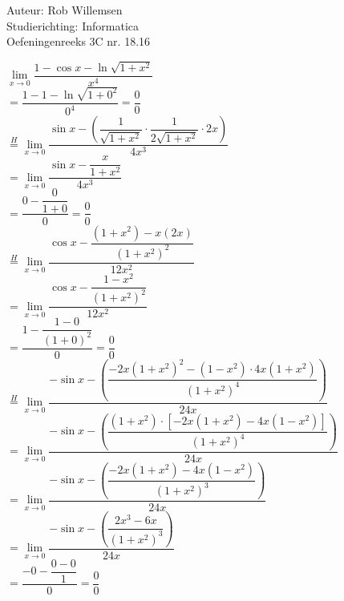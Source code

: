 \documentclass[a4paper]{article}
\newcommand{\limit}{\lim\limits}
\begin{document}
\noindent \large Auteur: Rob Willemsen \\
\noindent \large Studierichting: Informatica \\
\noindent \large Oefeningenreeks 3C nr. 18.16 \\

\medskip

\normalsize

$\limit_{x \rightarrow 0} \dfrac{1 - \cos x - \ln \sqrt{1+x^2}}{x^4} $ \\

$= \dfrac{1 - 1 - \ln \sqrt{1+0^2}}{0^4} = \dfrac{0}{0}$ \\

$\overset{H}{=}\limit_{x \rightarrow 0} \dfrac{\sin x - \left(\dfrac{1}{\sqrt{1+x^2}} \cdot \dfrac{1}{2\sqrt{1+x^2}} \cdot 2x\right)}{4x^3} $ \\

$=\limit_{x \rightarrow 0} \dfrac{\sin x - \dfrac{x}{1+x^2}}{4x^3} $ \\

$= \dfrac{0 - \dfrac{0}{1+0}}{0} = \dfrac{0}{0}$ \\

$\overset{H}{=}\limit_{x \rightarrow 0} \dfrac{\cos x - \dfrac{(1+x^2) - x(2x)}{(1+x^2)^2}}{12x^2} $ \\

$= \limit_{x \rightarrow 0} \dfrac{\cos x - \dfrac{1-x^2}{(1+x^2)^2}}{12x^2} $ \\

$= \dfrac{1 - \dfrac{1-0}{(1+0)^2}}{0} = \dfrac{0}{0}$ \\

$\overset{H}{=}\limit_{x \rightarrow 0} \dfrac{-\sin x - \left(\dfrac{-2x(1+x^2)^2 - (1-x^2) \cdot 4x(1+x^2)}{(1+x^2)^4}\right)}{24x} $ \\

$= \limit_{x \rightarrow 0} \dfrac{-\sin x - \left(\dfrac{(1+x^2) \cdot \left[-2x(1+x^2) - 4x(1-x^2)\right]}{(1+x^2)^4}\right)}{24x} $ \\

$= \limit_{x \rightarrow 0} \dfrac{-\sin x - \left(\dfrac{-2x(1+x^2) - 4x(1-x^2)}{(1+x^2)^3}\right)}{24x} $ \\

$= \limit_{x \rightarrow 0} \dfrac{-\sin x - \left(\dfrac{2x^3 - 6x}{(1+x^2)^3}\right)}{24x} $ \\

$= \dfrac{- 0 - \dfrac{0 - 0}{1}}{0} = \dfrac{0}{0} $\\
\end{document}
